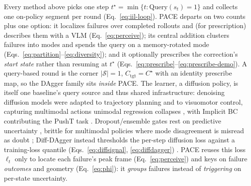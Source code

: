 \documentclass[letterpaper]{article} %
\begin{document}
Every method above picks one step
$t^\star\!=\!\min\{t:\mathrm{Query}(s_t)\!=\!1\}$ and collects one on-policy segment
per round (Eq.~\eqref{eq:iil-loop}). PACE departs on two counts plus one option: it
localizes failures over completed rollouts and (for prescription) describes them
with a VLM (Eq.~\eqref{eq:perceive}); its central addition clusters failures into
modes and spends the query on a memory-rotated mode
(Eqs.~\eqref{eq:partition}--\eqref{eq:diversity}); and it optionally prescribes the
correction's \emph{start state} rather than resuming at $t^\star$
(Eqs.~\eqref{eq:prescribe}--\eqref{eq:prescribe-demo}). A query-based round is the
corner $|\mathcal{S}|\!=\!1$, $C_{\mathrm{tgt}}\!=\!C^\star$ with an identity
prescribe map, so the DAgger family sits \emph{inside} PACE. The learner, a
diffusion policy, is itself one baseline's query source and thus shared
infrastructure: denoising diffusion models \cite{ho2020ddpm} were adapted to
trajectory planning \cite{janner2022diffuser} and to visuomotor control, capturing
multimodal actions unimodal regression collapses \cite{chi2023diffusionpolicy}, with
Implicit BC contributing the PushT task \cite{florence2021implicitbc}.
Dropout/ensemble gates rest on predictive uncertainty
\cite{gal2016dropout,lakshminarayanan2017ensembles,%
menda2017dropoutdagger,menda2019ensembledagger}, brittle for multimodal policies
where mode disagreement is misread as doubt \cite{lee2025diffdagger}; Diff-DAgger
instead thresholds the per-step diffusion loss against a training-loss quantile
(Eqs.~\eqref{eq:diffsignal}, \eqref{eq:diffdagger}) \cite{lee2025diffdagger}. PACE
reuses this loss $\ell_t$ only to locate each failure's peak frame
(Eq.~\eqref{eq:perceive}) and keys on failure \emph{outcomes} and geometry
(Eq.~\eqref{eq:phi}): it \emph{groups} failures instead of \emph{triggering} on
per-state uncertainty.
\end{document}

